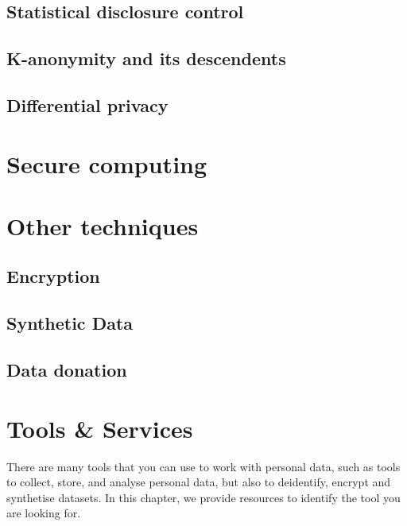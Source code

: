 \documentclass[
]{book}
\begin{document}
\hypertarget{sdc}{%
\section{Statistical disclosure control}\label{sdc}}

\hypertarget{k-anonymity-and-its-descendents}{%
\section{K-anonymity and its descendents}\label{k-anonymity-and-its-descendents}}

\hypertarget{differential-privacy}{%
\section{Differential privacy}\label{differential-privacy}}

\hypertarget{secure-computing}{%
\chapter{Secure computing}\label{secure-computing}}

\hypertarget{other-techniques}{%
\chapter{Other techniques}\label{other-techniques}}

\hypertarget{encryption}{%
\section{Encryption}\label{encryption}}

\hypertarget{synthetic-data}{%
\section{Synthetic Data}\label{synthetic-data}}

\hypertarget{data-donation}{%
\section{Data donation}\label{data-donation}}

\hypertarget{tools-and-services}{%
\chapter{Tools \& Services}\label{tools-and-services}}

There are many tools that you can use to work with personal data, such as tools
to collect, store, and analyse personal data, but also to deidentify, encrypt
and synthetise datasets. In this chapter, we provide resources to identify
the tool you are looking for.
\end{document}
